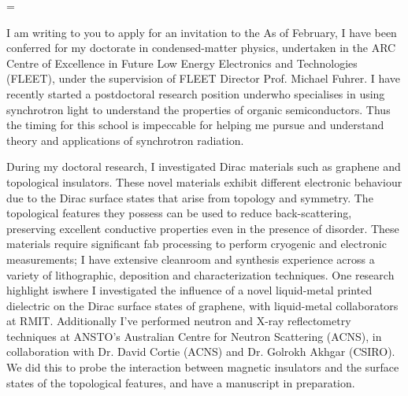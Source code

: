 \documentclass[10pt,a4paper,ragged2e,withhyper,paragraphstrue]{altacv}
\newcommand{\textalignment}{
	\justifying
    \tolerance=1 %
    \emergencystretch=\maxdimen
    \hyphenpenalty=10000 
    \hbadness=10000
}
\newcommand{\pind}{\hspace{24pt}}
\begin{document}
    

    \vspace{1em}

    {\color{emphasis}
    \textalignment
    \pind I am writing to you to apply for an invitation to the
    As of February, I have been conferred for my doctorate in condensed-matter physics, undertaken in the ARC Centre of Excellence in Future Low Energy Electronics and Technologies (FLEET), under the supervision of FLEET Director Prof. Michael Fuhrer.
    I have recently started a postdoctoral research position underwho specialises in using synchrotron light to understand the properties of organic semiconductors. Thus the timing for this school is impeccable for helping me pursue and understand theory and applications of synchrotron radiation.
    
  	\pind During my doctoral research, I investigated Dirac materials such as graphene and topological insulators. These novel materials exhibit different electronic behaviour due to the Dirac surface states that arise from topology and symmetry. The topological features they possess can be used to reduce back-scattering, preserving excellent conductive properties even in the presence of disorder. These materials require significant fab processing to perform cryogenic and electronic measurements; I have extensive cleanroom and synthesis experience across a variety of lithographic, deposition and characterization techniques. 
  	One research highlight iswhere I investigated the influence of a novel liquid-metal printed dielectric on the Dirac surface states of graphene, with liquid-metal collaborators at RMIT.  	
  	Additionally I've performed neutron and X-ray reflectometry techniques at ANSTO's Australian Centre for Neutron Scattering (ACNS), in collaboration with Dr. David Cortie (ACNS) and Dr. Golrokh Akhgar (CSIRO). We did this to probe the interaction between magnetic insulators and the surface states of the topological features, and have a manuscript in preparation.
  	    
}
\end{document}
